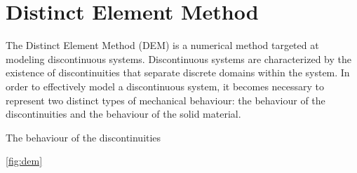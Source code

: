 \section{Distinct Element Method}
The Distinct Element Method (DEM) is a numerical method targeted at modeling discontinuous systems. Discontinuous systems are characterized by the existence of discontinuities that separate discrete domains within the system. In order to effectively model a discontinuous system, it becomes necessary to represent two distinct types of mechanical behaviour: the behaviour of the discontinuities and the behaviour of the solid material.

The behaviour of the discontinuities 

\ref{fig:dem}